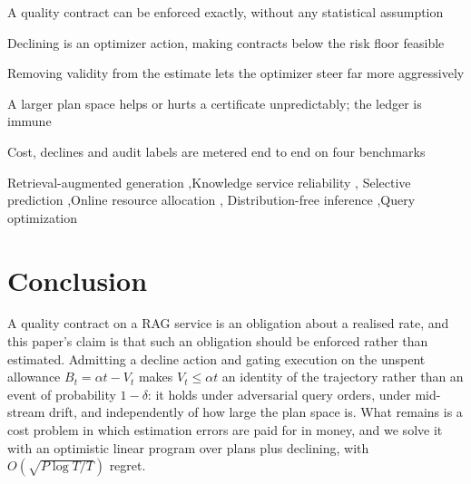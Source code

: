 \documentclass[a4paper,fleqn]{cas-dc}
\begin{document}
\begin{highlights}
\item A quality contract can be enforced exactly, without any statistical assumption
\item Declining is an optimizer action, making contracts below the risk floor feasible
\item Removing validity from the estimate lets the optimizer steer far more aggressively
\item A larger plan space helps or hurts a certificate unpredictably; the ledger is immune
\item Cost, declines and audit labels are metered end to end on four benchmarks
\end{highlights}

\begin{keywords}
Retrieval-augmented generation \sep Knowledge service reliability \sep
Selective prediction \sep Online resource allocation \sep
Distribution-free inference \sep Query optimization
\end{keywords}

\maketitle









\section{Conclusion}
\label{sec:conclusion}
A quality contract on a RAG service is an obligation about a realised
rate, and this paper's claim is that such an obligation should be
enforced rather than estimated. Admitting a decline action and gating
execution on the unspent allowance $B_t = \alpha t - V_t$ makes
$V_t \le \alpha t$ an identity of the trajectory rather than an event
of probability $1-\delta$: it holds under adversarial query orders,
under mid-stream drift, and independently of how large the plan space
is. What remains is a cost problem in which estimation errors are paid
for in money, and we solve it with an optimistic linear program over
plans plus declining, with $O(\sqrt{P\log T/T})$ regret.
\end{document}
